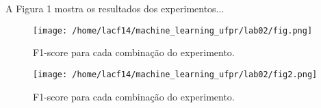 
A Figura 1 mostra os resultados dos experimentos... 

\begin{landscape}

\begin{figure}[]
\label{fig:fig1}
\centering
\texttt{[image: /home/lacf14/machine\_learning\_ufpr/lab02/fig.png]}
\caption{F1-score para cada combinação do experimento.}
\end{figure}
\end{landscape}

\begin{landscape}

\begin{figure}[]
\label{fig:fig2}
\centering
\texttt{[image: /home/lacf14/machine\_learning\_ufpr/lab02/fig2.png]}
\caption{F1-score para cada combinação do experimento.}
\end{figure}
\end{landscape}
